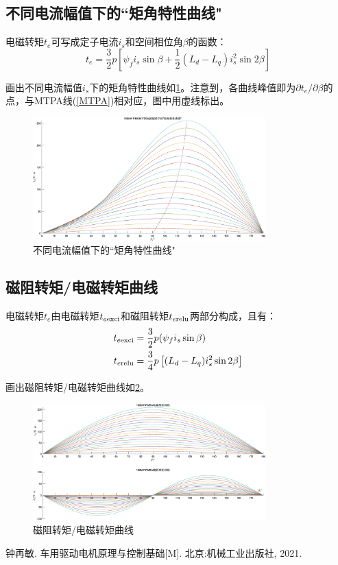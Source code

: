\documentclass[UTF8]{ctexart}
\numberwithin{figure}{section}
\numberwithin{table}{section}
\begin{document}
\subsection{不同电流幅值下的``矩角特性曲线"}
\label{subsection:2.10}

电磁转矩$t_e$可写成定子电流$i_s$和空间相位角$\beta$的函数\cite{b}：
\begin{equation}
	t_e=\frac{3}{2}p\left[\psi_f i_s \sin{\beta}+\frac{1}{2}(L_d-L_q)i_s^2\sin{2\beta}\right]
\end{equation}

画出不同电流幅值$i_s$下的矩角特性曲线如\cref{torAng}。注意到，各曲线峰值即为$\partial t_e/\partial\beta$的点，与MTPA线(\cref{MTPA})相对应，图中用虚线标出。

\begin{figure}[htbp]
	\centering
	\includegraphics[width=0.8\textwidth]{10}
	\caption{不同电流幅值下的``矩角特性曲线"}
	\label{torAng}
\end{figure}

\subsection{磁阻转矩/电磁转矩曲线}
\label{subsection:2.11}

电磁转矩$t_e$由电磁转矩$t_{e\rm exci}$和磁阻转矩$t_{e\rm relu}$两部分构成，且有\cite{b}：
\begin{align}
	t_{e\rm exci} & =\frac{3}{2}p(\psi_f i_s \sin{\beta})                \\
	t_{e\rm relu} & =\frac{3}{4}p\left[(L_d-L_q)i_s^2\sin{2\beta}\right]
\end{align}

画出磁阻转矩/电磁转矩曲线如\cref{torExciReluAng}。

\begin{figure}[htbp]
	\centering
	\includegraphics[width=0.8\textwidth]{11}
	\caption{磁阻转矩/电磁转矩曲线}
	\label{torExciReluAng}
\end{figure}

\clearpage

\begin{thebibliography}{99}
	钟再敏. 车用驱动电机原理与控制基础[M]. 北京:机械工业出版社, 2021.
\end{thebibliography}
\end{document}
